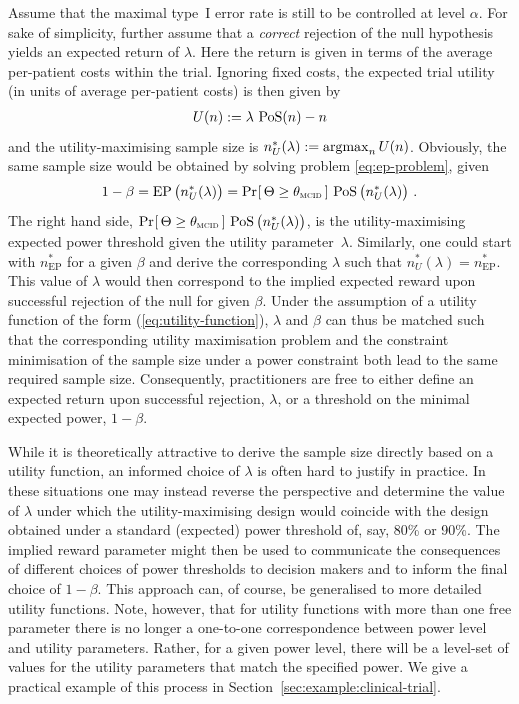 \documentclass{article}
\renewcommand{\Pr}{\operatorname{Pr}}
\newcommand{\argmax}[1]{\operatornamewithlimits{argmax}_{#1}}
\newcommand{\EP}{\operatorname{EP}}
\begin{document}
Assume that the maximal type~I error rate is still to be controlled at level $\alpha$.
For sake of simplicity, further assume that a \emph{correct}
rejection of the null hypothesis yields an expected return of $\lambda$.
Here the return is given in terms of the average per-patient costs within the trial.
Ignoring fixed costs, the expected trial utility (in units of average per-patient costs) is then given by
\begin{align}
    U(n) := \lambda\,\operatorname{PoS}(n) - n
    \label{eq:utility-function}
\end{align}
and the utility-maximising sample size is $n_{U}^*(\lambda) := \argmax{n} U(n)$.
Obviously, the same sample size would be obtained by solving problem \eqref{eq:ep-problem}, given
\begin{align}
    1-\beta = \EP\big( n_{U}^*(\lambda) \big) = \Pr_{ }[\, \Theta \geq \mcid \,] \, \PoS\big(n_{U}^*(\lambda)\big) \ .
\end{align}
The right hand side, $\Pr_{}[\, \Theta \geq \mcid \,] \, \PoS\big(n_{U}^*(\lambda)\big)$, is the utility-maximising expected power threshold given the utility parameter~$\lambda$.
Similarly, one could start with $n_{\EP}^*$ for a given $\beta$ and derive the corresponding $\lambda$ such that $n_{U}^*(\lambda)=n_{\EP}^*$.
This value of $\lambda$ would then correspond to the implied expected reward upon successful rejection of the null for given $\beta$.
Under the assumption of a utility function of the form (\ref{eq:utility-function}), $\lambda$ and $\beta$ can thus be matched such that the corresponding utility maximisation problem and the constraint minimisation of the sample size under a power constraint both lead to the same required sample size.
Consequently, practitioners are free to either define an expected return upon successful rejection, $\lambda$, or a threshold on the minimal expected power, $1-\beta$.

While it is theoretically attractive to derive the sample size directly based on a utility function, an informed choice of $\lambda$ is often hard to justify in practice.
In these situations one may instead reverse the perspective and determine the value of $\lambda$ under which the utility-maximising design would coincide with the design obtained under a standard (expected) power threshold of, say, 80\% or 90\%.
The implied reward parameter might then be used to communicate the consequences of different choices of power thresholds to decision makers and to inform the final choice of $1-\beta$.
This approach can, of course, be generalised to more detailed utility functions.
Note, however, that for utility functions with more than one free parameter there is no longer a one-to-one correspondence between power level and utility parameters.
Rather, for a given power level, there will be a level-set of values for the utility parameters that match the specified power.
We give a practical example of this process in Section~\ref{sec:example:clinical-trial}.
\end{document}
